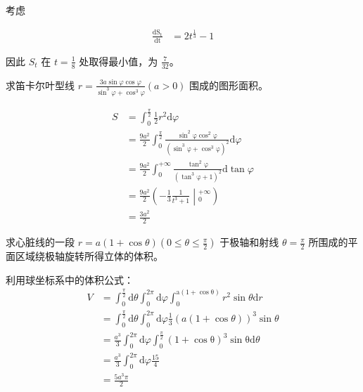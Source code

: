 考虑


\begin{align*}
	\mathrm{\frac{\mathrm{d} S_{t}}{\mathrm{d} t}} & =2t^{\frac{1}{3}} -1
\end{align*}


因此 $\displaystyle S_{t}$ 在 $\displaystyle t=\frac{1}{8}$ 处取得最小值，为 $\displaystyle \frac{7}{32}$。



\begin{ques}
	求笛卡尔叶型线 $\displaystyle r=\frac{3a\sin \varphi \cos \varphi }{\sin^{3} \varphi +\cos^{3} \varphi }( a >0)$ 围成的图形面积。
\end{ques}




\begin{align*}
	S & =\int _{0}^{\frac{\pi }{2}}\frac{1}{2} r^{2}\mathrm{d} \varphi \\
	& =\frac{9a^{2}}{2}\int _{0}^{\frac{\pi }{2}}\mathrm{\frac{\sin^{2} \varphi \cos^{2} \varphi }{\left(\sin^{3} \varphi +\cos^{3} \varphi \right)^{2}} d} \varphi \\
	& =\frac{9a^{2}}{2}\int _{0}^{+\infty }\mathrm{\frac{\tan^{2} \varphi }{\left(\tan^{3} \varphi +1\right)^{2}} d}\tan \varphi \\
	& =\frac{9a^{2}}{2}\left( -\frac{1}{3}\frac{1}{t^{3} +1}\middle| _{0}^{+\infty }\right)\\
	& =\frac{3a^{2}}{2}
\end{align*}




\begin{ques}
	求心脏线的一段 $\displaystyle r=a( 1+\cos \theta )\left( 0\leqslant \theta \leqslant \frac{\pi }{2}\right)$ 于极轴和射线 $\displaystyle \theta =\frac{\pi }{2}$ 所围成的平面区域绕极轴旋转所得立体的体积。
\end{ques}



利用球坐标系中的体积公式：
\begin{align*}
	V & =\int _{0}^{\frac{\pi }{2}}\mathrm{d} \theta \int _{0}^{2\pi }\mathrm{d} \varphi \mathrm{\int _{0}^{a( 1+\cos \theta )}} r^{2}\sin \theta \mathrm{d} r\\
	& =\int _{0}^{\frac{\pi }{2}}\mathrm{d} \theta \int _{0}^{2\pi }\mathrm{d} \varphi \frac{1}{3}( a( 1+\cos \theta ))^{3}\sin \theta \\
	& =\frac{a^{3}}{3}\int _{0}^{2\pi }\mathrm{d} \varphi \int _{0}^{\frac{\pi }{2}}\mathrm{( 1+\cos \theta )^{3}\sin \theta d} \theta \\
	& =\frac{a^{3}}{3}\int _{0}^{2\pi }\mathrm{d} \varphi \frac{15}{4}\\
	& =\frac{5a^{3} \pi }{2}
\end{align*}

\ifx\allfiles\undefined

\fi